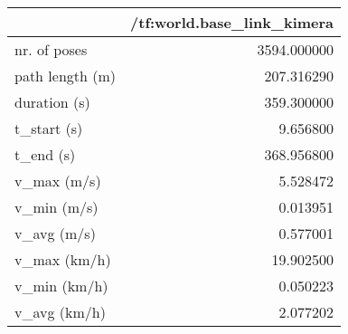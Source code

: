 \begin{tabular}{lr}
\toprule
{} &  /tf:world.base\_link\_kimera \\
\midrule
nr. of poses    &                 3594.000000 \\
path length (m) &                  207.316290 \\
duration (s)    &                  359.300000 \\
t\_start (s)     &                    9.656800 \\
t\_end (s)       &                  368.956800 \\
v\_max (m/s)     &                    5.528472 \\
v\_min (m/s)     &                    0.013951 \\
v\_avg (m/s)     &                    0.577001 \\
v\_max (km/h)    &                   19.902500 \\
v\_min (km/h)    &                    0.050223 \\
v\_avg (km/h)    &                    2.077202 \\
\bottomrule
\end{tabular}

